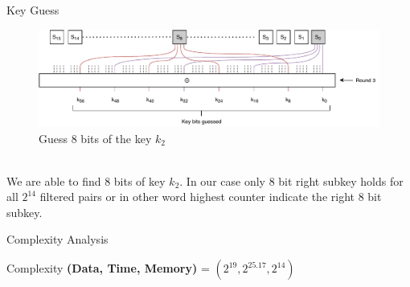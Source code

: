 \begin{frame}{Key Guess}
\begin{figure}[H]
	\centering
	\minipage{\textwidth}
	\includegraphics[width=\linewidth]{DC2.pdf}
	\endminipage
	\caption{Guess 8 bits of the key $k_2$}
	\label{fig:dc2}
\end{figure}\\
We are able to find 8 bits of key $k_2$. In our case only  8 bit right  subkey holds for all $2^{14}$ filtered pairs or in other word highest counter indicate the right 8 bit subkey.
\end{frame}

\begin{frame}{Complexity Analysis}
    \begin{block}{Complexity}
    \textbf{(Data, Time, Memory)} = $(2^{19},2^{25.17},2^{14})$
    \end{block}
\end{frame}
